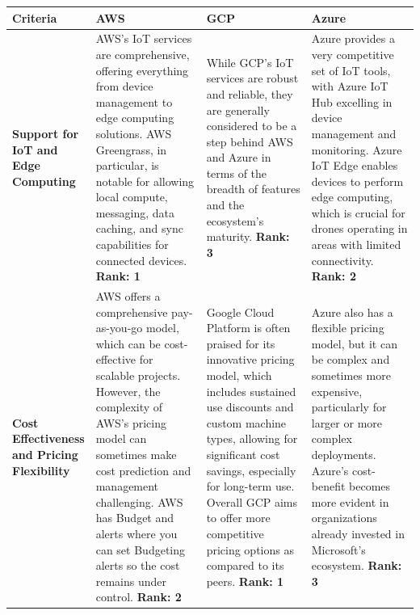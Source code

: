 \documentclass{article}
\begin{document}
\begin{table}[H]
    \centering
    \def\arraystretch{1.75}
    \begin{tabular}{|p{0.1\linewidth}| p{0.3\linewidth} | p{0.3\linewidth} | p{0.3\linewidth} |} \hline 
         \textbf{Criteria}&  \textbf{AWS}&  \textbf{GCP}& \textbf{Azure}\\ \hline 
         \textbf{Support for IoT and Edge Computing}& \color{blue}
         AWS's IoT services are comprehensive, offering everything from device management to edge computing solutions. AWS Greengrass, in particular, is notable for allowing local compute, messaging, data caching, and sync capabilities for connected devices.
         \textbf{Rank: 1}
         &  While GCP's IoT services are robust and reliable, they are generally considered to be a step behind AWS and Azure in terms of the breadth of features and the ecosystem's maturity. \textbf{Rank: 3}
        & Azure provides a very competitive set of IoT tools, with Azure IoT Hub excelling in device management and monitoring. Azure IoT Edge enables devices to perform edge computing, which is crucial for drones operating in areas with limited connectivity.
        \textbf{Rank: 2}\\ \hline
         \textbf{Cost Effectiveness and Pricing Flexibility}&  AWS offers a comprehensive pay-as-you-go model, which can be cost-effective for scalable projects. However, the complexity of AWS's pricing model can sometimes make cost prediction and management challenging. AWS has Budget and alerts where you can set Budgeting alerts so the cost remains under control. \textbf{Rank: 2}
        &  \color{blue} Google Cloud Platform is often praised for its innovative pricing model, which includes sustained use discounts and custom machine types, allowing for significant cost savings, especially for long-term use. Overall GCP aims to offer more competitive pricing options as compared to its peers.
        \textbf{Rank: 1}
        & Azure also has a flexible pricing model, but it can be complex and sometimes more expensive, particularly for larger or more complex deployments. Azure's cost-benefit becomes more evident in organizations already invested in Microsoft's ecosystem. \textbf{Rank: 3}\\ \hline 
        

\end{tabular}
\end{table}
\end{document}
